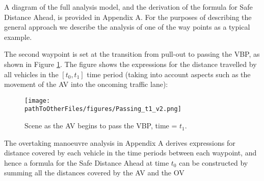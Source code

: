 A diagram of the full analysis model, and the derivation of the formula for Safe Distance Ahead, is provided in %
Appendix A. For the purposes of describing the general approach we describe the analysis of one of the way points as a typical example. 

The second waypoint is set at the transition from pull-out to passing the VBP, as shown in Figure \ref{fig:Passing_t1}. The figure shows the expressions for the distance travelled by all vehicles in the \textit{$[t_0, t_1]$} time period (taking into account aspects such as the movement of the AV into the oncoming traffic lane):
 \begin{figure}
    \centering
    \texttt{[image: \\pathToOtherFiles/figures/Passing\_t1\_v2.png]}
    \caption{Scene as the AV begins to pass the VBP, time = $t_1$.}
    \label{fig:Passing_t1}
 \end{figure}

The overtaking manoeuvre analysis in Appendix A%
derives expressions for distance covered by each vehicle in the time periods between each waypoint, and hence a formula for the Safe Distance Ahead at time $t_0$ can be constructed by summing all the distances covered by the AV and the OV

